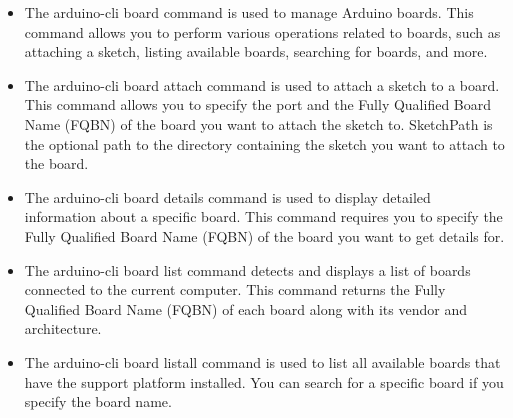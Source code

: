 \begin{itemize}
    
    \item {}
    
    The arduino-cli board command is used to manage Arduino boards. This command allows you to perform various operations related to boards, such as attaching a sketch, listing available boards, searching for boards, and more.
    
    
    \item{}
    
    The arduino-cli board attach command is used to attach a sketch to a board. This command allows you to specify the port and the Fully Qualified Board Name (FQBN) of the board you want to attach the sketch to. SketchPath is the optional path to the directory containing the sketch you want to attach to the board.
    
    
    
    \item {}
    
    The arduino-cli board details command is used to display detailed information about a specific board. This command requires you to specify the Fully Qualified Board Name (FQBN) of the board you want to get details for.
    
    
    \item {}
    
    The arduino-cli board list command detects and displays a list of boards connected to the current computer. This command returns the Fully Qualified Board Name (FQBN) of each board along with its vendor and architecture.
    
    
    \item {}
    
    The arduino-cli board listall command is used to list all available boards  that have the support platform installed. You can search for a specific board if you specify the board name.
    
    

\end{itemize}
